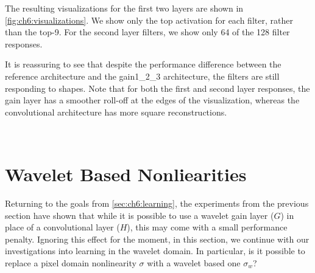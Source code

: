 The resulting visualizations for the first two layers are shown in
\autoref{fig:ch6:visualizations}. We show only the top activation for each
filter, rather than the top-9. For the second layer filters, we show only 64 of
the 128 filter responses.

It is reassuring to see that despite the
performance difference between the reference architecture and the gain1\_2\_3
architecture, the filters are still responding to shapes. Note that for both the
first and second layer responses, the gain layer has a smoother roll-off at the
edges of the visualization, whereas the convolutional architecture has more
square reconstructions.

\begin{figure}
  \centering
   \\
  \label{fig:ch6:visualizations}
\end{figure}

\section{Wavelet Based Nonliearities}
Returning to the goals from \autoref{sec:ch6:learning}, the experiments from the
previous section have shown that while it is possible to use a wavelet gain
layer ($G$) in place of a convolutional layer ($H$), this may come with a small
performance penalty. Ignoring this effect for the moment, in this section, we
continue with our investigations into learning in the wavelet domain. In
particular, is it possible to replace a pixel domain nonlinearity $\sigma$ with
a wavelet based one $\sigma_w$?

